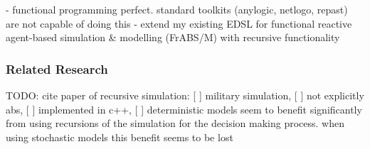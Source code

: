 - functional programming perfect. standard toolkits (anylogic, netlogo, repast) are not capable of doing this
- extend my existing EDSL for functional reactive agent-based simulation \& modelling (FrABS/M) with recursive functionality
 
\subsubsection{Related Research}
TODO: \cite{gilmer_recursive_2000} cite paper of recursive simulation: [ ] military simulation, [ ] not explicitly abs, [ ] implemented in c++, [ ] deterministic models seem to benefit significantly from using recursions of the simulation for the decision making process. when using stochastic models this benefit seems to be lost